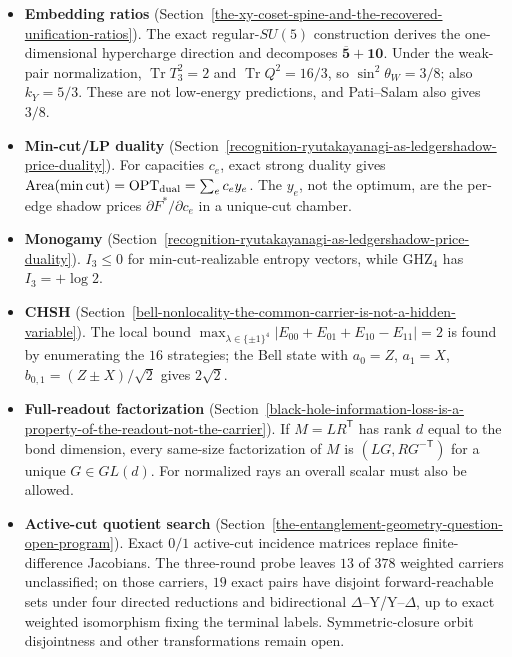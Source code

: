\documentclass[11pt]{article}
\theoremstyle{definition}
\providecommand{\tightlist}{\setlength{\itemsep}{0pt}\setlength{\parskip}{0pt}}
\begin{document}
\begin{itemize}\tightlist
\item \textbf{Embedding ratios} (Section~\ref{the-xy-coset-spine-and-the-recovered-unification-ratios}). The exact
  regular-\(SU(5)\) construction derives the one-dimensional hypercharge direction and decomposes
  \(\overline{\mathbf5}+\mathbf{10}\). Under the weak-pair normalization, \(\operatorname{Tr}T_3^2=2\) and
  \(\operatorname{Tr}Q^2=16/3\), so \(\sin^2\theta_W=3/8\); also \(k_Y=5/3\). These are not low-energy predictions,
  and Pati--Salam also gives \(3/8\).
\item \textbf{Min-cut/LP duality} (Section~\ref{recognition-ryutakayanagi-as-ledgershadow-price-duality}). For
  capacities \(c_e\), exact strong duality gives
  \(\operatorname{Area}(\min\mathrm{cut})=\operatorname{OPT}_{\rm dual}=\sum_e c_e y_e\). The \(y_e\), not the optimum,
  are the per-edge shadow prices \(\partial F^*/\partial c_e\) in a unique-cut chamber.
\item \textbf{Monogamy} (Section~\ref{recognition-ryutakayanagi-as-ledgershadow-price-duality}). \(I_3\le0\) for
  min-cut-realizable entropy vectors, while GHZ\(_4\) has \(I_3=+\log2\).
\item \textbf{CHSH} (Section~\ref{bell-nonlocality-the-common-carrier-is-not-a-hidden-variable}). The local bound
  \(\max_{\lambda\in\{\pm1\}^4}|E_{00}+E_{01}+E_{10}-E_{11}|=2\) is found by enumerating the \(16\) strategies; the Bell
  state with \(a_0=Z\), \(a_1=X\), \(b_{0,1}=(Z\pm X)/\sqrt2\) gives \(2\sqrt2\).
\item \textbf{Full-readout factorization} (Section~\ref{black-hole-information-loss-is-a-property-of-the-readout-not-the-carrier}).
  If \(M=LR^{\mathsf T}\) has rank \(d\) equal to the bond dimension, every same-size factorization of \(M\) is
  \((LG,RG^{-\mathsf T})\) for a unique \(G\in GL(d)\). For normalized rays an overall scalar must also be allowed.
\item \textbf{Active-cut quotient search} (Section~\ref{the-entanglement-geometry-question-open-program}). Exact \(0/1\)
  active-cut incidence matrices replace finite-difference Jacobians. The three-round probe leaves \(13\) of \(378\)
  weighted carriers unclassified; on those carriers, \(19\) exact pairs have disjoint forward-reachable sets under four
  directed reductions and bidirectional \(\Delta\)--Y/Y--\(\Delta\), up to exact weighted isomorphism fixing the
  terminal labels. Symmetric-closure orbit disjointness and other transformations remain open.
\end{itemize}
\end{document}
